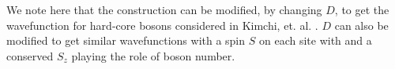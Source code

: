 %
%
%
%

We note here that the construction can be modified, by changing $D$, to get the wavefunction for hard-core bosons considered in Kimchi, et. al. \cite{kimchi2013}. $D$ can also be modified to get similar wavefunctions with a spin $S$ on each site with and a conserved $S_z$ playing the role of boson number.

